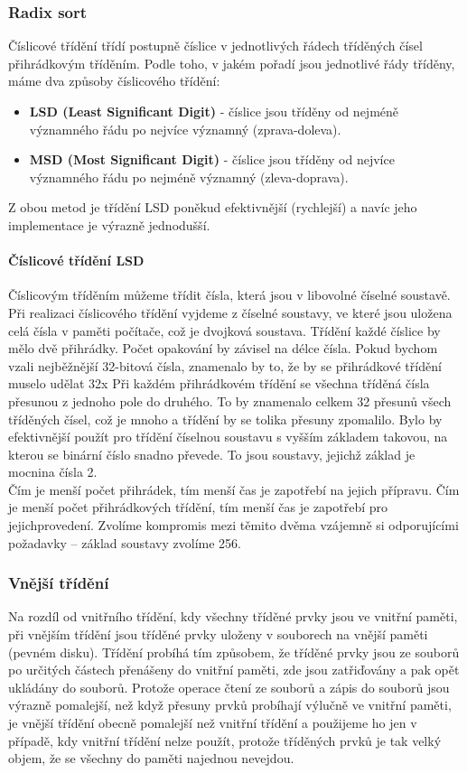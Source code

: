 \documentclass[10pt,a4paper]{article}
\begin{document}
\subsubsection{Radix sort}
Číslicové třídění třídí postupně číslice v jednotlivých řádech tříděných čísel přihrádkovým tříděním. Podle toho, v jakém pořadí jsou jednotlivé řády tříděny, máme dva způsoby číslicového třídění:
\begin{itemize}
	\item \textbf{LSD (Least Significant Digit)} - číslice jsou tříděny od nejméně významného řádu po nejvíce významný (zprava-doleva).
	\item \textbf{MSD (Most Significant Digit)} - číslice jsou tříděny od nejvíce významného řádu po nejméně významný (zleva-doprava).
\end{itemize}
Z obou metod je třídění LSD poněkud efektivnější (rychlejší) a navíc jeho implementace je výrazně jednodušší.
\paragraph{Číslicové třídění LSD}
Číslicovým tříděním můžeme třídit čísla, která jsou v libovolné číselné soustavě. Při realizaci číslicového třídění vyjdeme z číselné soustavy, ve které jsou uložena celá čísla v paměti počítače, což je dvojková soustava. Třídění každé číslice by mělo dvě přihrádky. Počet opakování by závisel na délce čísla. Pokud bychom vzali nejběžnější 32-bitová čísla, znamenalo by to, že by se přihrádkové třídění muselo udělat 32x Při každém přihrádkovém třídění se všechna tříděná čísla přesunou z jednoho pole do druhého. To by znamenalo celkem 32 přesunů všech tříděných čísel, což je mnoho a třídění by se tolika přesuny zpomalilo. Bylo by efektivnější použít pro třídění číselnou soustavu s vyšším základem takovou, na kterou se binární číslo snadno převede. To jsou soustavy, jejichž základ je mocnina čísla 2. \\
Čím je menší počet přihrádek, tím menší čas je zapotřebí na jejich přípravu. Čím je menší počet přihrádkových třídění, tím menší čas je zapotřebí pro jejichprovedení. Zvolíme kompromis mezi těmito dvěma vzájemně si odporujícími požadavky – základ soustavy zvolíme 256.

\subsubsection{Vnější třídění}
Na rozdíl od vnitřního třídění, kdy všechny tříděné prvky jsou ve vnitřní paměti, při vnějším třídění jsou tříděné prvky uloženy v souborech na vnější paměti (pevném disku). Třídění probíhá tím způsobem, že tříděné prvky jsou ze souborů po určitých částech přenášeny do vnitřní paměti, zde jsou zatřiďovány a pak opět ukládány do souborů. Protože operace čtení ze souborů a zápis do souborů jsou výrazně pomalejší, než když přesuny prvků probíhají výlučně ve vnitřní paměti, je vnější třídění obecně pomalejší než vnitřní třídění a použijeme ho jen v případě, kdy vnitřní třídění nelze použít, protože tříděných prvků je tak velký objem, že se všechny do paměti najednou nevejdou.
\end{document}
